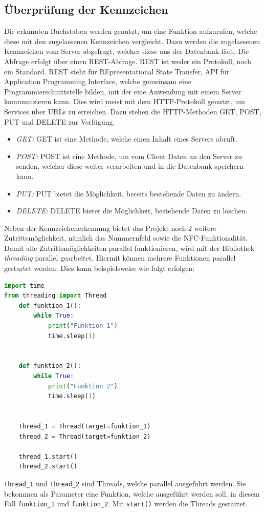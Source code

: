 \subsection{Überprüfung der Kennzeichen}
Die erkannten Buchstaben werden genutzt, um eine Funktion aufzurufen, welche diese mit den zugelassenen Kennzeichen vergleicht. Dazu werden die zugelassenen Kennzeichen vom Server abgefragt, welcher diese aus der Datenbank lädt. Die Abfrage erfolgt über einen REST-Abfrage.
REST ist weder ein Protokoll, noch ein Standard. REST steht für REpresentational State Transfer, API für Application Programming Interface, welche gemeinsam eine Programmierschnittstelle bilden, mit der eine Anwendung mit einem Server kommunizieren kann. Dies wird meist mit dem HTTP-Protokoll genutzt, um Services über URLs zu erreichen. Dazu stehen die HTTP-Methoden GET, POST, PUT und DELETE zur Verfügung.
\begin{itemize}
    \item \textit{GET: } GET ist eine Methode, welche einen Inhalt eines Servers abruft.
    \item \textit{POST: } POST ist eine Methode, um vom Client Daten an den Server zu senden, welcher diese weiter verarbeiten und in die Datenbank speichern kann.
    \item \textit{PUT: } PUT bietet die Möglichkeit, bereits bestehende Daten zu ändern.
    \item \textit{DELETE: } DELETE bietet die Möglichkeit, bestehende Daten zu löschen.
\end{itemize}\cite{WhatIsREST}
Neben der Kennzeichenerkennung bietet das Projekt noch 2 weitere Zutrittsmöglichkeit, nämlich das Nummernfeld sowie die NFC-Funktionalität. Damit alle Zutrittsmöglichkeiten parallel funktionieren, wird mit der Bibliothek \textit{threading} parallel gearbeitet. Hiermit können mehrere Funktionen parallel gestartet werden. Dies kann beispielsweise wie folgt erfolgen: 
\begin{lstlisting}[language=Python, caption=Funktionsweise von Multiprocessing, label=lst:lsg:multiprocessing]
import time
from threading import Thread
    def funktion_1():
        while True:
            print("Funktion 1")
            time.sleep(1)
    
    
    def funktion_2():
        while True:
            print("Funktion 2")
            time.sleep(1)
    
    
    thread_1 = Thread(target=funktion_1)
    thread_2 = Thread(target=funktion_2)
    
    thread_1.start()
    thread_2.start()
\end{lstlisting}
\verb|thread_1| und \verb|thread_2| sind Threads, welche parallel ausgeführt werden. Sie bekommen als Parameter eine Funktion, welche ausgeführt werden soll, in diesem Fall \verb|funktion_1| und \verb|funktion_2|. Mit \verb|start()| werden die Threads gestartet.
    \cite{threading}
